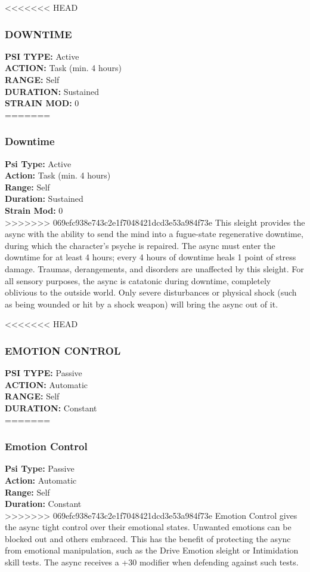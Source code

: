 <<<<<<< HEAD
\subsubsection{DOWNTIME}
\textbf{PSI TYPE:} Active \\ 
\textbf{ACTION:} Task (min. 4 hours) \\ 
\textbf{RANGE:} Self \\ 
\textbf{DURATION:} Sustained \\
\textbf{STRAIN MOD:} 0 \\
=======
\subsubsection{Downtime}
\textbf{Psi Type:} Active \\ 
\textbf{Action:} Task (min. 4 hours) \\ 
\textbf{Range:} Self \\ 
\textbf{Duration:} Sustained \\
\textbf{Strain Mod:} 0 \\
>>>>>>> 069efc938e743c2e1f7048421dcd3e53a984f73e
This sleight provides the async with the ability
to send the mind into a fugue-state regenerative
downtime, during which the character’s psyche is
repaired. The async must enter the downtime for
at least 4 hours; every 4 hours of downtime heals
1 point of stress damage. Traumas, derangements,
and disorders are unaffected by this sleight. For
all sensory purposes, the async is catatonic during
downtime, completely oblivious to the outside
world. Only severe disturbances or physical shock
(such as being wounded or hit by a shock weapon)
will bring the async out of it.

<<<<<<< HEAD
\subsubsection{EMOTION CONTROL}
\textbf{PSI TYPE:} Passive \\ 
\textbf{ACTION:} Automatic \\ 
\textbf{RANGE:} Self \\ 
\textbf{DURATION:} Constant \\
=======
\subsubsection{Emotion Control}
\textbf{Psi Type:} Passive \\ 
\textbf{Action:} Automatic \\ 
\textbf{Range:} Self \\ 
\textbf{Duration:} Constant \\
>>>>>>> 069efc938e743c2e1f7048421dcd3e53a984f73e
Emotion Control gives the async tight control
over their emotional states. Unwanted emotions
can be blocked out and others embraced. This has
the benefit of protecting the async from emotional
manipulation, such as the Drive Emotion sleight or
Intimidation skill tests. The async receives a +30
modifier when defending against such tests.

